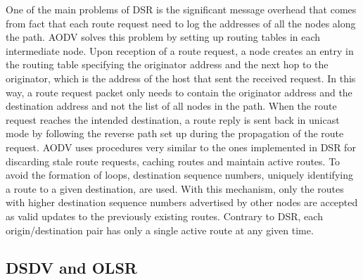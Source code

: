 One of the main problems of \gls{DSR} is the significant message overhead that comes from fact that each route request need to log the addresses of all the nodes along the path. \gls{AODV} solves this problem by setting up routing tables in each intermediate node. Upon reception of a route request, a node creates an entry in the routing table specifying the originator address and the next hop to the originator, which is the address of the host that sent the received request. In this way, a route request packet only needs to contain the originator address and the destination address and not the list of all nodes in the path. When the route request reaches the intended destination, a route reply is sent back in unicast mode by following the reverse path set up during the propagation of the route request. \gls{AODV} uses procedures very similar to the ones implemented in \gls{DSR} for discarding stale route requests, caching routes and maintain active routes. To avoid the formation of loops, destination sequence numbers, uniquely identifying a route to a given destination, are used. With this mechanism, only the routes with higher destination sequence numbers advertised by other nodes are accepted as valid updates to the previously existing routes. Contrary to \gls{DSR}, each origin/destination pair has only a single active route at any given time.



\subsection{DSDV and OLSR}

